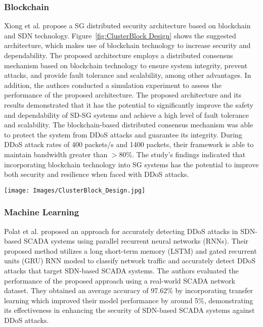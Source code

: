\documentclass[conference]{IEEEtran}
\begin{document}
\subsubsection{Blockchain} Xiong et al. \cite{xiong2021distributed} propose a SG distributed security architecture based on blockchain and SDN technology. Figure~\ref{fig:ClusterBlock Design} shows the suggested architecture, which makes use of blockchain technology to increase security and dependability. The proposed architecture employs a distributed consensus mechanism based on blockchain technology to ensure system integrity, prevent attacks, and provide fault tolerance and scalability, among other advantages. In addition, the authors conducted a simulation experiment to assess the performance of the proposed architecture. The proposed architecture and its results demonstrated that it has the potential to significantly improve the safety and dependability of SD-SG systems and achieve a high level of fault tolerance and scalability. The blockchain-based distributed consensus mechanism was able to protect the system from DDoS attacks and guarantee its integrity. During DDoS attack rates of 400 packets/s and 1400 packets, their framework is able to maintain bandwidth greater than $>80\%$. The study's findings indicated that incorporating blockchain technology into SG systems has the potential to improve both security and resilience when faced with DDoS attacks.

\begin{figure*}[h]
\centering
\texttt{[image: Images/ClusterBlock\_Design.jpg]}
\caption{ClusterBlock Design presented in \cite{xiong2021distributed}  }
\label{fig:ClusterBlock Design}
\end{figure*}



\subsubsection{Machine Learning}Polat et al. \cite{polat2022novel} proposed an approach for accurately detecting DDoS attacks in SDN-based SCADA systems using parallel recurrent neural networks (RNNs). Their proposed method utilizes a long short-term memory (LSTM) and gated recurrent units (GRU) RNN modesl to classify network traffic and accurately detect DDoS attacks that target SDN-based SCADA systems. The authors evaluated the performance of the proposed approach using a real-world SCADA network dataset. They obtained an average accuracy of 97.62\% by incorporating transfer learning which improved their model performance by around 5\%, demonstrating its effectiveness in enhancing the security of SDN-based SCADA systems against DDoS attacks.
\end{document}
